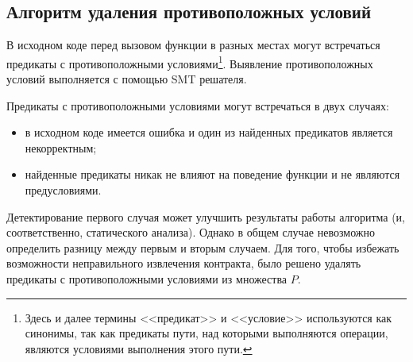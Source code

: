 \subsection{Алгоритм удаления противоположных условий}
\label{section:deleting}
В исходном коде перед вызовом функции в разных местах могут встречаться предикаты с противоположными условиями\footnote{Здесь и далее термины <<предикат>> и <<условие>> используются как синонимы, так как предикаты пути, над которыми выполняются операции, являются условиями выполнения этого пути.}. Выявление противоположных условий выполняется с помощью SMT решателя. 

Предикаты с противоположными условиями могут встречаться в двух случаях:
\begin{itemize}
\item в исходном коде имеется ошибка и один из найденных предикатов является некорректным;
\item найденные предикаты никак не влияют на поведение функции и не являются предусловиями.
\end{itemize}
Детектирование первого случая может улучшить результаты работы алгоритма (и, соответственно, статического анализа). Однако в общем случае невозможно определить разницу между первым и вторым случаем. Для того, чтобы избежать возможности неправильного извлечения контракта, было решено удалять предикаты с противоположными условиями из множества $P$.

